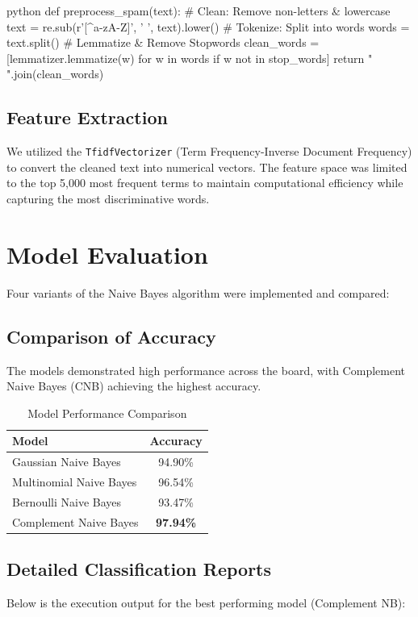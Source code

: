 \documentclass[12pt]{article}
\begin{document}
\begin{jupytercode}{python}
def preprocess_spam(text):
    # Clean: Remove non-letters & lowercase
    text = re.sub(r'[^a-zA-Z]', ' ', text).lower()
    # Tokenize: Split into words
    words = text.split()
    # Lemmatize & Remove Stopwords
    clean_words = [lemmatizer.lemmatize(w) for w in words 
                   if w not in stop_words]
    return " ".join(clean_words)
\end{jupytercode}

\subsection{Feature Extraction}
We utilized the \texttt{TfidfVectorizer} (Term Frequency-Inverse Document Frequency) to convert the cleaned text into numerical vectors. The feature space was limited to the top 5,000 most frequent terms to maintain computational efficiency while capturing the most discriminative words.

\section{Model Evaluation}
Four variants of the Naive Bayes algorithm were implemented and compared:

\subsection{Comparison of Accuracy}
The models demonstrated high performance across the board, with Complement Naive Bayes (CNB) achieving the highest accuracy.

\begin{table}[h!]
    \centering
    \begin{tabular}{lc}
        \toprule
        \textbf{Model} & \textbf{Accuracy} \\
        \midrule
        Gaussian Naive Bayes & 94.90\% \\
        Multinomial Naive Bayes & 96.54\% \\
        Bernoulli Naive Bayes & 93.47\% \\
        Complement Naive Bayes & \textbf{97.94\%} \\
        \bottomrule
    \end{tabular}
    \caption{Model Performance Comparison}
\end{table}

\subsection{Detailed Classification Reports}
Below is the execution output for the best performing model (Complement NB):
\end{document}
